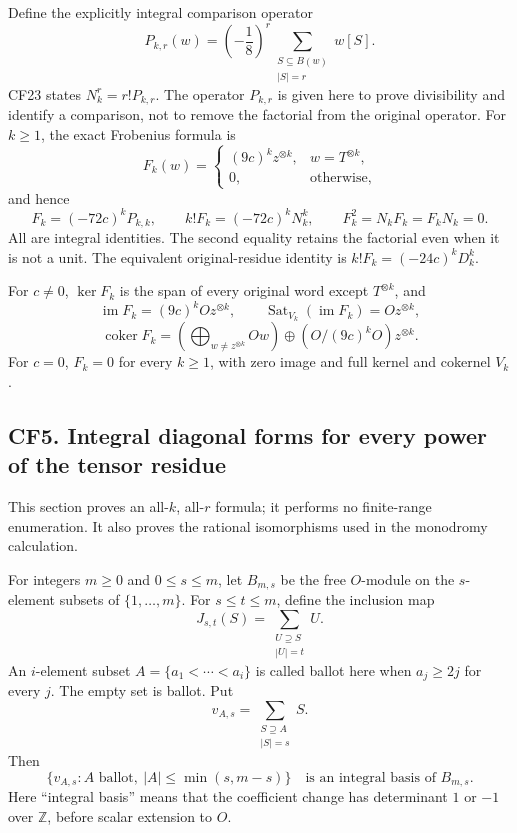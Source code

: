 Define the explicitly integral comparison operator
\[
 P_{k,r}(w)=\left(-\frac18\right)^r
 \sum_{\substack{S\subseteq B(w)\\|S|=r}}w[S].
 \tag{CF26}
\]
CF23 states \(N_k^r=r!P_{k,r}\). The operator \(P_{k,r}\) is given here to prove divisibility and identify a comparison, not to remove the factorial from the original operator. For \(k\geq1\), the exact Frobenius formula is
\[
 \boxed{F_k(w)=
 \begin{cases}
 (9c)^kz^{\otimes k},&w=T^{\otimes k},\\
 0,&\text{otherwise},
 \end{cases}}
 \tag{CF27}
\]
and hence
\[
 F_k=(-72c)^kP_{k,k},\qquad
 k!F_k=(-72c)^kN_k^k,
 \qquad F_k^2=N_kF_k=F_kN_k=0.
 \tag{CF28}
\]
All are integral identities. The second equality retains the factorial even when it is not a unit. The equivalent original-residue identity is \(k!F_k=(-24c)^kD_k^k\).

For \(c\neq0\), \(\ker F_k\) is the span of every original word except \(T^{\otimes k}\), and
\[
 \operatorname{im}F_k=(9c)^kOz^{\otimes k},
 \qquad\operatorname{Sat}_{V_k}(\operatorname{im}F_k)=Oz^{\otimes k},
\]
\[
 \operatorname{coker}F_k
 =\left(\bigoplus_{w\neq z^{\otimes k}}Ow\right)
 \oplus (O/(9c)^kO)z^{\otimes k}.
 \tag{CF29}
\]
For \(c=0\), \(F_k=0\) for every \(k\geq1\), with zero image and full kernel and cokernel \(V_k\).

\subsection{CF5. Integral diagonal forms for every power of the tensor residue}\label{cf5.-integral-diagonal-forms-for-every-power-of-the-tensor-residue}

This section proves an all-\(k\), all-\(r\) formula; it performs no finite-range enumeration. It also proves the rational isomorphisms used in the monodromy calculation.

For integers \(m\geq0\) and \(0\leq s\leq m\), let \(B_{m,s}\) be the free \(O\)-module on the \(s\)-element subsets of \(\{1,\ldots,m\}\). For \(s\leq t\leq m\), define the inclusion map
\[
 J_{s,t}(S)=\sum_{\substack{U\supseteq S\\|U|=t}}U.
 \tag{CF30}
\]
An \(i\)-element subset \(A=\{a_1<\cdots<a_i\}\) is called ballot here when \(a_j\geq2j\) for every \(j\). The empty set is ballot. Put
\[
 v_{A,s}=\sum_{\substack{S\supseteq A\\|S|=s}}S.
\]
Then
\[
 \{v_{A,s}: A\text{ ballot},\ |A|\leq\min(s,m-s)\}
 \quad\text{is an integral basis of }B_{m,s}.
 \tag{CF31}
\]
Here ``integral basis'' means that the coefficient change has determinant \(1\) or \(-1\) over \(\mathbb Z\), before scalar extension to \(O\).

